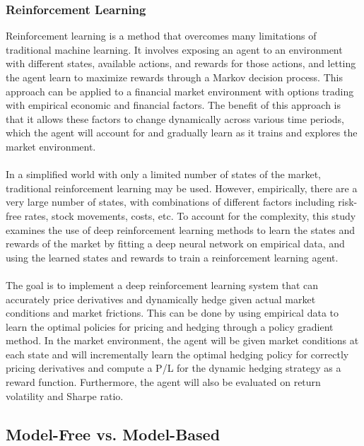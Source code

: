 \subsubsection{Reinforcement Learning}
Reinforcement learning is a method that overcomes many limitations of traditional machine learning. It involves exposing an agent to an environment with different states, available actions, and rewards for those actions, and letting the agent learn to maximize rewards through a Markov decision process. This approach can be applied to a financial market environment with options trading with empirical economic and financial factors. The benefit of this approach is that it allows these factors to change dynamically across various time periods, which the agent will account for and gradually learn as it trains and explores the market environment.
\\
\\
In a simplified world with only a limited number of states of the market, traditional reinforcement learning may be used. However, empirically, there are a very large number of states, with combinations of different factors including risk-free rates, stock movements, costs, etc. To account for the complexity, this study examines the use of deep reinforcement learning methods to learn the states and rewards of the market by fitting a deep neural network on empirical data, and using the learned states and rewards to train a reinforcement learning agent.
\\
\\
The goal is to implement a deep reinforcement learning system that can accurately price derivatives and dynamically hedge given actual market conditions and market frictions. This can be done by using empirical data to learn the optimal policies for pricing and hedging through a policy gradient method. In the market environment, the agent will be given market conditions at each state and will incrementally learn the optimal hedging policy for correctly pricing derivatives and compute a P/L for the dynamic hedging strategy as a reward function. Furthermore, the agent will also be evaluated on return volatility and Sharpe ratio.

\subsection{Model-Free vs. Model-Based}

